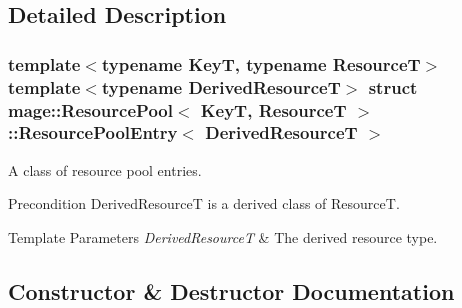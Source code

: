 \subsection{Detailed Description}
\subsubsection*{template$<$typename KeyT, typename ResourceT$>$\newline
template$<$typename Derived\+ResourceT$>$\newline
struct mage\+::\+Resource\+Pool$<$ Key\+T, Resource\+T $>$\+::\+Resource\+Pool\+Entry$<$ Derived\+Resource\+T $>$}

A class of resource pool entries.

\begin{DoxyPrecond}{Precondition}
{\ttfamily Derived\+ResourceT} is a derived class of {\ttfamily ResourceT}. 
\end{DoxyPrecond}

\begin{DoxyTemplParams}{Template Parameters}
{\em Derived\+ResourceT} & The derived resource type. \\
\hline
\end{DoxyTemplParams}


\subsection{Constructor \& Destructor Documentation}
\hypertarget{structmage_1_1_resource_pool_1_1_resource_pool_entry_a8e255033a6f139f5f30e17869325eb2e}{}\label{structmage_1_1_resource_pool_1_1_resource_pool_entry_a8e255033a6f139f5f30e17869325eb2e} 
